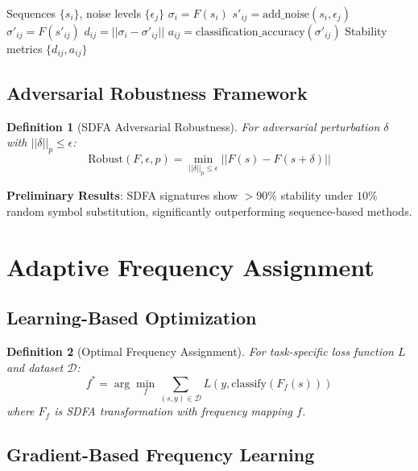 \documentclass[11pt]{article}
\newtheorem{definition}{Definition}
\begin{document}
\begin{algorithm}[h]
\caption{Noise Robustness Validation}
\begin{algorithmic}[1]
\REQUIRE Sequences $\{s_i\}$, noise levels $\{\epsilon_j\}$
    \STATE $\sigma_i = F(s_i)$ 
        \STATE $s'_{ij} = \text{add\_noise}(s_i, \epsilon_j)$
        \STATE $\sigma'_{ij} = F(s'_{ij})$ 
        \STATE $d_{ij} = ||\sigma_i - \sigma'_{ij}||$ 
        \STATE $a_{ij} = \text{classification\_accuracy}(\sigma'_{ij})$ 
    \ENDFOR
\ENDFOR
\RETURN Stability metrics $\{d_{ij}, a_{ij}\}$
\end{algorithmic}
\end{algorithm}

\subsection{Adversarial Robustness Framework}

\begin{definition}[SDFA Adversarial Robustness]
For adversarial perturbation $\delta$ with $||\delta||_p \leq \epsilon$:
\[\text{Robust}(F, \epsilon, p) = \min_{||\delta||_p \leq \epsilon} ||F(s) - F(s + \delta)||\]
\end{definition}

\textbf{Preliminary Results}: SDFA signatures show $>90\%$ stability under $10\%$ random symbol substitution, significantly outperforming sequence-based methods.

\section{Adaptive Frequency Assignment}

\subsection{Learning-Based Optimization}

\begin{definition}[Optimal Frequency Assignment]
For task-specific loss function $L$ and dataset $\mathcal{D}$:
\[f^* = \arg\min_f \sum_{(s,y) \in \mathcal{D}} L(y, \text{classify}(F_f(s)))\]
where $F_f$ is SDFA transformation with frequency mapping $f$.
\end{definition}

\subsection{Gradient-Based Frequency Learning}
\end{document}
